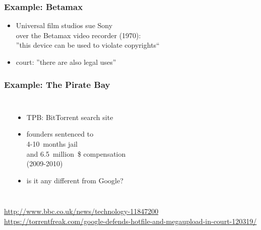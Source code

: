\documentclass[dvipsnames]{beamer}
\theoremstyle{plain}
\begin{document}
\begin{frame}
  \frametitle{Example: Betamax}

  \begin{itemize}
    \item Universal film studios sue Sony\\
      over the Betamax video recorder (1970):\\
      ''this device can be used to violate copyrights``
    \item court: ''there are also legal uses''
  \end{itemize}
\end{frame}

\begin{frame}
  \frametitle{Example: The Pirate Bay}

  \begin{columns}
    \begin{center}
    \end{center}

    \begin{itemize}
      \item TPB: BitTorrent search site
      \item founders sentenced to\\
        4-10~months jail\\
        and 6.5~million~\$ compensation\\
        (2009-2010)

      \pause
      \medskip
      \item is it any different from Google?
    \end{itemize}
  \end{columns}

  \medskip
  \tiny{\url{http://www.bbc.co.uk/news/technology-11847200}}\\
  \tiny{\url{https://torrentfreak.com/google-defends-hotfile-and-megaupload-in-court-120319/}}\\
\end{frame}
\end{document}
